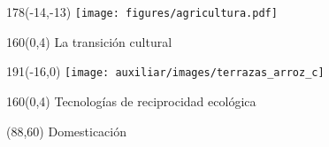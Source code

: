 \documentclass[shownotes,aspectratio=169]{beamer}
\begin{document}
\begin{frame}[plain]

\begin{textblock}{178}(-14,-13)
\centering
\texttt{[image: figures/agricultura.pdf]} \ \ \ \ \ 
\end{textblock}

\begin{textblock}{160}(0,4)
 \centering \LARGE La transición cultural
\end{textblock}
\vspace{0.3cm}


\end{frame}

\begin{frame}[plain]
\begin{textblock}{191}(-16,0)
 \centering
 \texttt{[image: auxiliar/images/terrazas\_arroz\_c]}
\end{textblock}

 \begin{textblock}{160}(0,4)
  \LARGE \centering \textcolor{black!5}{Tecnologías de reciprocidad ecológica}\\ 
 \end{textblock} 

 \begin{textblock}{70}(88,60)
  \Large \textcolor{black!5}{Domesticación}\\ 
 \end{textblock} 


\end{frame}
% 
% 
% 
% 
\end{document}
